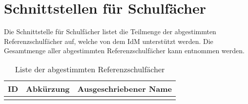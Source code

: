 \section{Schnittstellen für Schulfächer}
Die Schnittstelle für Schulfächer listet die Teilmenge der abgestimmten Referenzschulfächer auf, welche von dem IdM unterstützt werden.
Die Gesamtmenge aller abgestimmten Referenzschulfächer kann  entnommen werden.

\begin{longtable}{|p{}|p{}|p{}|}
\caption{Liste der abgestimmten Referenzschulfächer}
\endfoot
\caption{Liste der abgestimmten Referenzschulfächer}
		\label{tab:rest:api:reference-subjects:list}
\endlastfoot 
\hline
\textbf{ID} & \textbf{Abkürzung} & \textbf{Ausgeschriebener Name} \\ \hline
\endhead
 & &  \\ \hline
	\end{longtable}


%

%
%